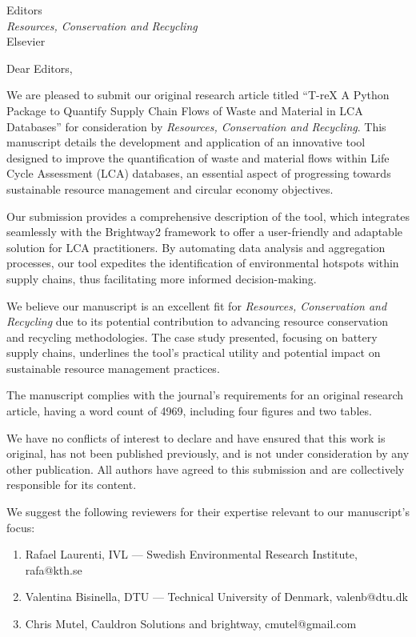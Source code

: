 \documentclass[10pt]{letter}
\begin{document}
\thispagestyle{empty}
\begin{letter}{Editors\\\textit{Resources, Conservation and Recycling}\\Elsevier}

\opening{Dear Editors,}

We are pleased to submit our original research article titled ``T-reX\: A Python Package to Quantify Supply Chain Flows of Waste and Material in LCA Databases'' for consideration by \textit{Resources, Conservation and Recycling}. This manuscript details the development and application of an innovative tool designed to improve the quantification of waste and material flows within Life Cycle Assessment (LCA) databases, an essential aspect of progressing towards sustainable resource management and circular economy objectives.

Our submission provides a comprehensive description of the tool, which integrates seamlessly with the Brightway2 framework to offer a user-friendly and adaptable solution for LCA practitioners. By automating data analysis and aggregation processes, our tool expedites the identification of environmental hotspots within supply chains, thus facilitating more informed decision-making.

We believe our manuscript is an excellent fit for \textit{Resources, Conservation and Recycling} due to its potential contribution to advancing resource conservation and recycling methodologies. The case study presented, focusing on battery supply chains, underlines the tool's practical utility and potential impact on sustainable resource management practices.

The manuscript complies with the journal's requirements for an original research article, having a word count of 4969, including four figures and two tables.

We have no conflicts of interest to declare and have ensured that this work is original, has not been published previously, and is not under consideration by any other publication. All authors have agreed to this submission and are collectively responsible for its content. 

\vspace{1em}

We suggest the following reviewers for their expertise relevant to our manuscript's focus:

\begin{enumerate}
    \item {Rafael Laurenti, IVL --- Swedish Environmental Research Institute, rafa@kth.se}
    \item {Valentina Bisinella,  DTU --- Technical University of Denmark, valenb@dtu.dk}
    \item {Chris Mutel, Cauldron Solutions and brightway, cmutel@gmail.com}
\end{enumerate}
\vspace{1em}


\end{letter}
\end{document}
